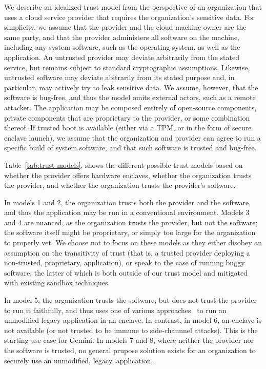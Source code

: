 We describe an idealized trust model from the perspective of an
organization that uses a cloud service provider that requires the organization's
sensitive data.
%
For simplicity, we assume that the provider and the cloud machine owner are the
same party, and that the provider administers all software on the machine,
including any system software, such as the operating system, as well as the
application.
%
An untrusted provider may deviate arbitrarily from the stated service, but
remains subject to standard cryptographic assumptions.
%
Likewise, untrusted software may deviate abitrarily from its stated purpose
and, in particular, may actively try to leak sensitive data.
%
We assume, however, that the software is bug-free, and thus the model omits
external actors, such as a remote attacker.
%
The application may be composed entirely of open-source components, private
components that are proprietary to the provider, or some combination thereof.
%
If trusted boot is available  (either via a TPM, or in the form of secure
enclave launch), we assume that the organization and provider can agree to run
a specific build of system software, and that such software is trusted and
bug-free.


Table~\ref{tab:trust-models}, shows the different possible trust models based
on whether the provider offers hardware enclaves, whether the organization
trusts the provider, and whether the organization trusts the provider's
software.


In models 1 and 2, the organization trusts both
the provider and the software, and thus the application may be run in a
conventional environment.
%
Models 3 and 4 are nuanced, as the organization trusts the provider, but not
the software; the software itself might be proprietary, or simply too large for
the organization to properly vet.
%
We choose not to focus on these models as they either disobey an assumption on
the transitivity of trust (that is, a trusted provider deploying a non-trusted,
proprietary, application), or speak to the case of running buggy software,
the latter of which is both outside of our trust model and mitigated with
existing sandbox techniques.


In model 5, the organization trusts the software, but does not trust the
provider to run it faithfully, and thus uses one of various
approaches~\cite{talos,haven,scone,graphene} to
run an unmodified legacy application in an enclave.
%
In contrast, in model 6, an enclave is not available (or not trusted to be
immune to side-channnel attacks).
%
This is the starting use-case for Gemini.
%
In models 7 and 8, where neither the provider nor the software is trusted, no
general prupose solution exists for an organization to securely use an
unmodified, legacy, application.


